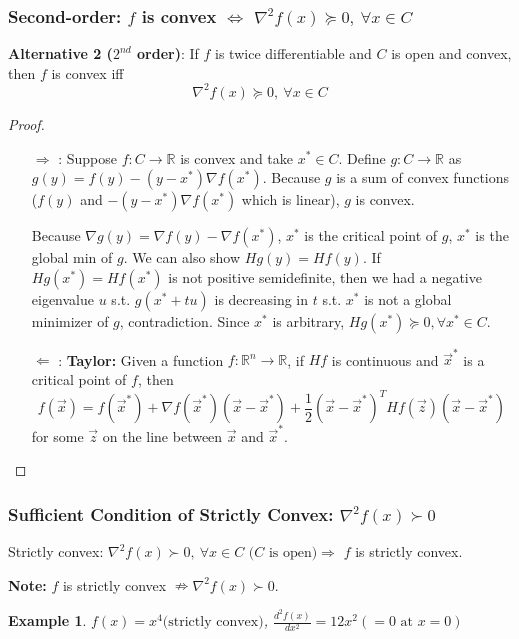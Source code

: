 \documentclass[11pt,a4paper]{article}
\newtheorem{example}{Example}
\begin{document}
\subsubsection{Second-order: $f$ is convex $\Leftrightarrow$ $\nabla^{2} f(x) \succeq 0,\ \forall x \in C$}
\textbf{Alternative 2 ($2^{nd}$ order)}: If $f$ is twice differentiable and $C$ is open and convex, then $f$ is convex iff
$$
\nabla^{2} f(x) \succeq 0,\ \forall x \in C
$$
\begin{proof}
    \begin{enumerate}
        \item[$\Rightarrow$]: Suppose $f:C \rightarrow \mathbb{R}$ is convex and take $x^*\in C$. Define $g: C \rightarrow \mathbb{R}$ as $g(y)=f(y)-(y-x^*)\nabla f(x^*)$. Because $g$ is a sum of convex functions ($f(y)$ and $-(y-x^*)\nabla f(x^*)$ which is linear), $g$ is convex.
        
        Because $\nabla g(y)=\nabla f(y)-\nabla f(x^*)$, $x^*$ is the critical point of $g$, $x^*$ is the global min of $g$. We can also show $Hg(y)=Hf(y)$. If $Hg(x^*)=Hf(x^*)$ is not positive semidefinite, then we had a negative eigenvalue $u$ s.t. $g(x^*+tu)$ is decreasing in $t$ s.t. $x^*$ is not a global minimizer of $g$, contradiction. Since $x^*$ is arbitrary, $Hg(x^*)\succeq 0,\forall x^*\in C$.
        \item[$\Leftarrow$]: \textbf{Taylor:} Given a function $f:\mathbb{R}^n \rightarrow \mathbb{R}$, if $Hf$ is continuous and $\vec{x}^*$ is a critical point of $f$, then
        $$f(\vec{x})=f(\vec{x}^*)+\nabla f(\vec{x}^*)(\vec{x}-\vec{x}^*)+\frac{1}{2}(\vec{x}-\vec{x}^*)^T Hf(\vec{z}) (\vec{x}-\vec{x}^*)$$
        for some $\vec{z}$ on the line between $\vec{x}$ and $\vec{x}^*$.
    \end{enumerate}
\end{proof}





\subsubsection{Sufficient Condition of Strictly Convex: $\nabla^{2} f(x) \succ 0$}
Strictly convex: $\nabla^{2} f(x) \succ 0,\ \forall x \in C \text{ ($C$ is open)} \Rightarrow	$ $f$ is strictly convex.


\textbf{Note:} $f$ is strictly convex $\nRightarrow \nabla^{2} f(x) \succ 0$.
\begin{example}
$f(x)=x^4\text{(strictly convex)}$, $\frac{d^2f(x)}{dx^2}=12x^2(=0\text{ at }x=0)$
\end{example}
\end{document}
